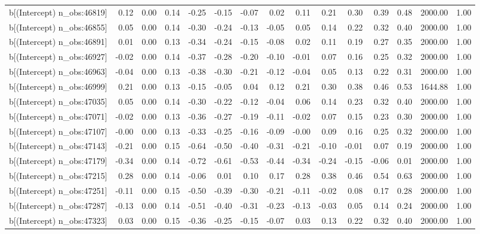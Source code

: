 \begin{table}[ht]
\begin{tabular}{rrrrrrrrrrrrrrr}
  b[(Intercept) n\_obs:46819] & 0.12 & 0.00 & 0.14 & -0.25 & -0.15 & -0.07 & 0.02 & 0.11 & 0.21 & 0.30 & 0.39 & 0.48 & 2000.00 & 1.00 \\ 
  b[(Intercept) n\_obs:46855] & 0.05 & 0.00 & 0.14 & -0.30 & -0.24 & -0.13 & -0.05 & 0.05 & 0.14 & 0.22 & 0.32 & 0.40 & 2000.00 & 1.00 \\ 
  b[(Intercept) n\_obs:46891] & 0.01 & 0.00 & 0.13 & -0.34 & -0.24 & -0.15 & -0.08 & 0.02 & 0.11 & 0.19 & 0.27 & 0.35 & 2000.00 & 1.00 \\ 
  b[(Intercept) n\_obs:46927] & -0.02 & 0.00 & 0.14 & -0.37 & -0.28 & -0.20 & -0.10 & -0.01 & 0.07 & 0.16 & 0.25 & 0.32 & 2000.00 & 1.00 \\ 
  b[(Intercept) n\_obs:46963] & -0.04 & 0.00 & 0.13 & -0.38 & -0.30 & -0.21 & -0.12 & -0.04 & 0.05 & 0.13 & 0.22 & 0.31 & 2000.00 & 1.00 \\ 
  b[(Intercept) n\_obs:46999] & 0.21 & 0.00 & 0.13 & -0.15 & -0.05 & 0.04 & 0.12 & 0.21 & 0.30 & 0.38 & 0.46 & 0.53 & 1644.88 & 1.00 \\ 
  b[(Intercept) n\_obs:47035] & 0.05 & 0.00 & 0.14 & -0.30 & -0.22 & -0.12 & -0.04 & 0.06 & 0.14 & 0.23 & 0.32 & 0.40 & 2000.00 & 1.00 \\ 
  b[(Intercept) n\_obs:47071] & -0.02 & 0.00 & 0.13 & -0.36 & -0.27 & -0.19 & -0.11 & -0.02 & 0.07 & 0.15 & 0.23 & 0.30 & 2000.00 & 1.00 \\ 
  b[(Intercept) n\_obs:47107] & -0.00 & 0.00 & 0.13 & -0.33 & -0.25 & -0.16 & -0.09 & -0.00 & 0.09 & 0.16 & 0.25 & 0.32 & 2000.00 & 1.00 \\ 
  b[(Intercept) n\_obs:47143] & -0.21 & 0.00 & 0.15 & -0.64 & -0.50 & -0.40 & -0.31 & -0.21 & -0.10 & -0.01 & 0.07 & 0.19 & 2000.00 & 1.00 \\ 
  b[(Intercept) n\_obs:47179] & -0.34 & 0.00 & 0.14 & -0.72 & -0.61 & -0.53 & -0.44 & -0.34 & -0.24 & -0.15 & -0.06 & 0.01 & 2000.00 & 1.00 \\ 
  b[(Intercept) n\_obs:47215] & 0.28 & 0.00 & 0.14 & -0.06 & 0.01 & 0.10 & 0.17 & 0.28 & 0.38 & 0.46 & 0.54 & 0.63 & 2000.00 & 1.00 \\ 
  b[(Intercept) n\_obs:47251] & -0.11 & 0.00 & 0.15 & -0.50 & -0.39 & -0.30 & -0.21 & -0.11 & -0.02 & 0.08 & 0.17 & 0.28 & 2000.00 & 1.00 \\ 
  b[(Intercept) n\_obs:47287] & -0.13 & 0.00 & 0.14 & -0.51 & -0.40 & -0.31 & -0.23 & -0.13 & -0.03 & 0.05 & 0.14 & 0.24 & 2000.00 & 1.00 \\ 
  b[(Intercept) n\_obs:47323] & 0.03 & 0.00 & 0.15 & -0.36 & -0.25 & -0.15 & -0.07 & 0.03 & 0.13 & 0.22 & 0.32 & 0.40 & 2000.00 & 1.00 \\ 

\end{tabular}
\end{table}
